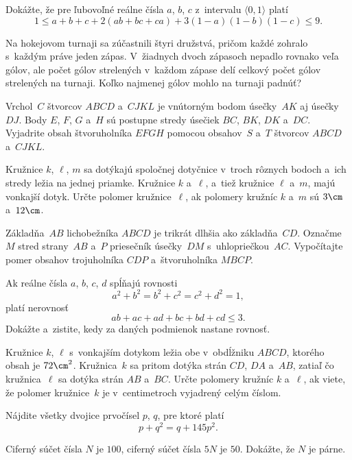 {%
Dokážte, že pre ľubovoľné reálne čísla $a$, $b$, $c$ z~intervalu
$\langle0,1\rangle$ platí 
$$
1\le a+b+c+2(ab+bc+ca)+3(1-a)(1-b)(1-c)\le9.
$$}

{%
Na hokejovom turnaji sa zúčastnili štyri družstvá, pričom každé zohralo
s~každým práve jeden zápas. V~žiadnych dvoch zápasoch nepadlo rovnako veľa gólov, ale počet gólov
strelených v~každom zápase delí celkový počet gólov strelených na turnaji.
Koľko najmenej gólov mohlo na turnaji padnúť?}

{%
Vrchol~$C$ štvorcov $ABCD$ a~$CJKL$ je vnútorným bodom
úsečky~$AK$ aj úsečky~$DJ$. Body $E$, $F$, $G$ a~$H$ sú postupne stredy
úsečiek $BC$, $BK$, $DK$ a~$DC$. Vyjadrite obsah štvoruholníka $EFGH$ pomocou obsahov~$S$ a~$T$ štvorcov $ABCD$ a~$CJKL$.}

{%
Kružnice $k$, $\ell$, $m$ sa dotýkajú spoločnej dotyčnice v~troch rôznych bodoch a~ich stredy ležia na jednej priamke. Kružnice $k$ a~$\ell$, a~tiež kružnice $\ell$ a~$m$, majú vonkajší dotyk. Určte polomer kružnice~$\ell$,
ak polomery kružníc $k$ a~$m$ sú $3\cm$ a~$12\cm$.}

{%
Základňa~$AB$ lichobežníka $ABCD$ je trikrát dlhšia ako
základňa~$CD$. Označme $M$ stred strany~$AB$ a~$P$ priesečník
úsečky~$DM$ s~uhlopriečkou~$AC$. Vypočítajte pomer obsahov
trojuholníka $CDP$ a~štvoruholníka $MBCP$.}

{%
Ak reálne čísla $a$, $b$, $c$, $d$ spĺňajú rovnosti
$$
a^{2}+b^{2}=b^{2}+c^{2}=c^{2}+d^{2}=1,
$$
platí nerovnosť
$$
ab + ac + ad + bc + bd + cd\le3.
$$
Dokážte a~zistite, kedy za daných podmienok nastane rovnosť.}

{%
Kružnice $k$, $\ell$ s~vonkajším dotykom ležia obe 
v~obdĺžniku $ABCD$, ktorého obsah je $72\cm^{2}$. Kružnica~$k$ sa
pritom dotýka strán $CD$, $DA$ a~$AB$, zatiaľ čo kružnica~$\ell$ sa dotýka
strán $AB$ a~$BC$. Určte polomery kružníc $k$ a~$\ell$,
ak viete, že polomer kružnice~$k$ je v~centimetroch vyjadrený celým číslom.}

{%
Nájdite všetky dvojice prvočísel $p$, $q$, pre ktoré platí
$$
p+q^{2}=q+145p^{2}.
$$}

{%
Ciferný súčet čísla $N$ je $100$, ciferný súčet čísla $5N$ je $50$. Dokážte, že $N$ je párne.}

